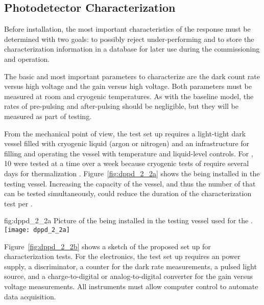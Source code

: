 \subsection{Photodetector Characterization}
\label{sec:dp-pds-selection-characterization}

Before installation, the most important characteristics of the  response must be determined with two goals: to possibly reject under-performing  and to store the characterization information in a database for later use during the  commissioning and operation.

The basic and most important parameters to characterize are the dark count rate versus high voltage and the gain versus high voltage. Both parameters must be measured at room and cryogenic temperatures. As with the baseline  model, the rates of pre-pulsing and after-pulsing should be negligible, but they will be measured as part of testing. 

From the mechanical point of view, the test set up requires a light-tight dark vessel filled with cryogenic liquid (argon or nitrogen) and an infrastructure for filling and operating the vessel with temperature and liquid-level controls. For , \num{10}  were tested at a time over a week because cryogenic tests of  require several days for  thermalization \cite{Belver:2018erf}. Figure~\ref{fig:dppd_2_2a} shows the    being installed in the testing vessel.
Increasing the capacity of the vessel, and thus the number of  that can be tested simultaneously,
could reduce the duration of the characterization test per .

\begin{dunefigure}{fig:dppd_2_2a}
{Picture of the  being installed in the testing vessel used for the  .}
\texttt{[image: dppd\_2\_2a]}
\end{dunefigure}

Figure~\ref{fig:dppd_2_2b} shows a sketch of the proposed set up for  characterization tests. For the electronics, the test set up requires an  power supply, a discriminator, a counter for the dark rate measurements, a pulsed light source, and a charge-to-digital or analog-to-digital converter for the  gain versus voltage measurements. All instruments must allow computer control to automate data acquisition.

